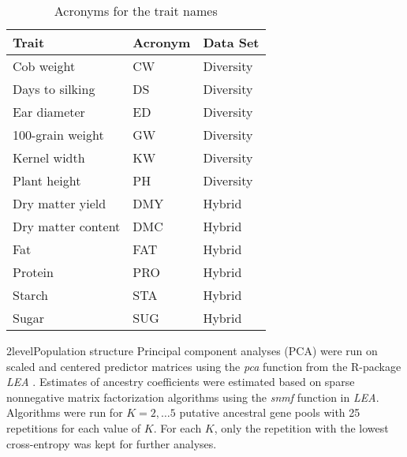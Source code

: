 \documentclass[12pt,titlepage]{article}
\begin{document}
\begin{table}[]
\centering
\caption{Acronyms for the trait names}
\label{table:TraitKey}
\begin{tabular}{@{}lll@{}}
\toprule
Trait              & Acronym & Data Set  \\ \midrule
Cob weight         & CW      & Diversity \\
Days to silking    & DS      & Diversity \\
Ear diameter       & ED      & Diversity \\
100-grain weight   & GW      & Diversity \\
Kernel width       & KW      & Diversity \\
Plant height       & PH      & Diversity \\
Dry matter yield   & DMY     & Hybrid    \\
Dry matter content & DMC     & Hybrid    \\
Fat                & FAT     & Hybrid    \\
Protein            & PRO     & Hybrid    \\
Starch             & STA     & Hybrid    \\
Sugar              & SUG     & Hybrid    \\ \bottomrule
\end{tabular}
\end{table}

\Genetics2level{Population structure}
Principal component analyses (PCA) were run on scaled and centered predictor 
matrices using the \emph{pca} function from the R-package \textit{LEA} 
\cite{Frichot2015}.
Estimates of ancestry coefficients were estimated based on sparse nonnegative
matrix factorization algorithms \cite{Frichot2014} using the \emph{snmf} 
function in \textit{LEA}.
Algorithms were run for $K=2, \dots 5$ putative ancestral gene pools with 25
repetitions for each value of $K$. 
For each $K$, only the repetition with the lowest cross-entropy was kept for 
further analyses.
\end{document}
